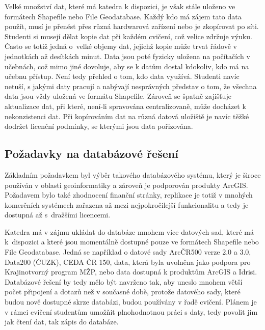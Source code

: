 Velké množství dat, které má katedra k dispozici, je však stále uloženo ve formátech Shapefile nebo File Geodatabase. Každý kdo má zájem tato data použít, musí je přenést přes různá hardwarová zařízení nebo je zkopírovat po síti. Studenti si musejí dělat kopie dat při každém cvičení, což velice zdržuje výuku. Často se totiž jedná o~velké objemy dat, jejichž kopie může trvat řádově v jednotkách až desítkách minut. Data jsou poté fyzicky uložena na počítačích v učebnách, což mimo jiné dovoluje, aby se k datům dostal kdokoliv, kdo má na učebnu přístup. Není tedy přehled o tom, kdo data využívá. Studenti navíc netuší, s jakými daty pracují a nabývají nesprávných představ o tom, že všechna data jsou vždy uložená ve formátu Shapefile. Zároveň se špatně zajišťuje aktualizace dat, při které, není-li spravována centralizovaně, může docházet k nekonzistenci dat. Při kopírováním dat na různá datová uložiště je navíc těžké dodržet licenční podmínky, se kterými jsou data pořizována. 

\subsection{Požadavky na databázové řešení}
\label{kPozadavky}

Základním požadavkem byl výběr takového databázového systému, který je široce používán v oblasti geoinformatiky a zároveň je podporován produkty ArcGIS. Požadavem bylo také zhodnocení finanční stránky, replikace je totiž v mnohých komerčních systémech zařazena až mezi nejpokročilejší funkcionalitu a tedy je dostupná až s~dražšími licencemi. 

Katedra má v zájmu ukládat do databáze mnohem více datových sad, které má k~dispozici a které jsou momentálně dostupné pouze ve formátech Shapefile nebo File Geodatabase. Jedná se například o datové sady ArcČR500 verze 2.0 a 3.0, Data200 (ČUZK), CEDA ČR 150, data, která byla uvolněna jako podpora pro Krajinotvorný program MŽP, nebo data dostupná k produktům ArcGIS a Idrisi. Databázové řešení by tedy mělo být navrženo tak, aby uneslo mnohem větší počet připojení a dotazů než v současné době, protože datového sady, které budou nově dostupné skrze databázi, budou používány v řadě cvičení. Plánem je v rámci cvičení studentům umožňit plnohodnotnou práci s daty, tedy povolit jim jak čtení dat, tak zápis do databáze. 


